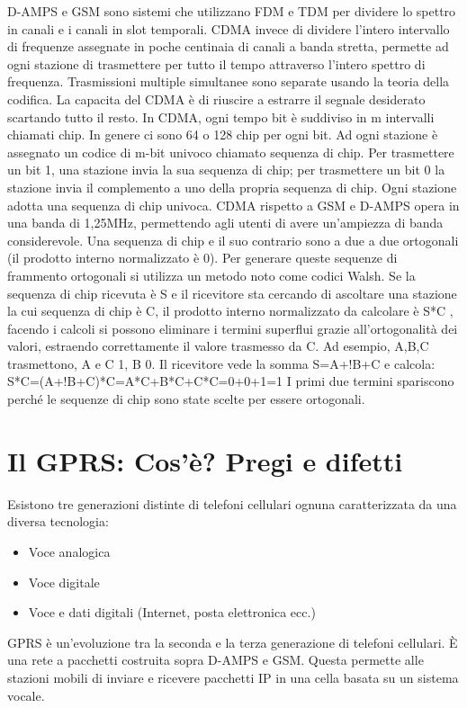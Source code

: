 D-AMPS e GSM sono sistemi che utilizzano FDM e TDM per dividere lo spettro in canali e i canali in slot temporali. CDMA invece di dividere l’intero intervallo di frequenze assegnate in poche centinaia di canali a banda stretta, permette ad ogni stazione di trasmettere per tutto il tempo attraverso l’intero spettro di frequenza. Trasmissioni multiple simultanee sono separate usando la teoria della codifica. La capacita del CDMA è di riuscire a estrarre il segnale desiderato scartando tutto il resto.
In CDMA, ogni tempo bit è suddiviso in m intervalli chiamati chip. In genere ci sono 64 o 128 chip per ogni bit. Ad ogni stazione è assegnato un codice di m-bit univoco chiamato sequenza di chip.
Per trasmettere un bit 1, una stazione invia la sua sequenza di chip; per trasmettere un bit 0 la stazione invia il complemento a uno della propria sequenza di chip.
Ogni stazione adotta una sequenza di chip univoca.
CDMA rispetto a GSM e D-AMPS opera in una banda di 1,25MHz, permettendo agli utenti di avere un’ampiezza di banda considerevole.
Una sequenza di chip e il suo contrario sono a due a due ortogonali (il prodotto interno normalizzato è 0). Per generare queste sequenze di frammento ortogonali si utilizza un metodo noto come codici Walsh. 
Se la sequenza di chip ricevuta è S e il ricevitore sta cercando di ascoltare una stazione la cui sequenza di chip è C, il prodotto interno normalizzato da calcolare è S*C , facendo i calcoli si possono eliminare i termini superflui grazie all’ortogonalità dei valori, estraendo correttamente il valore trasmesso da C. 
Ad esempio, A,B,C trasmettono, A e C 1, B 0. Il ricevitore vede la somma S=A+!B+C e calcola:
S*C=(A+!B+C)*C=A*C+B*C+C*C=0+0+1=1
I primi due termini spariscono perché le sequenze di chip sono state scelte per essere ortogonali.

\section{Il GPRS: Cos’è? Pregi e difetti}

Esistono tre generazioni distinte di telefoni cellulari ognuna caratterizzata da una diversa tecnologia:
\begin{itemize}
\item	Voce analogica
\item	Voce digitale
\item	Voce e dati digitali (Internet, posta elettronica ecc.)
\end{itemize}
GPRS è un’evoluzione tra la seconda e la terza generazione di telefoni cellulari. È una rete a pacchetti costruita sopra D-AMPS e GSM. Questa permette alle stazioni mobili di inviare e ricevere pacchetti IP in una cella basata su un sistema vocale.


